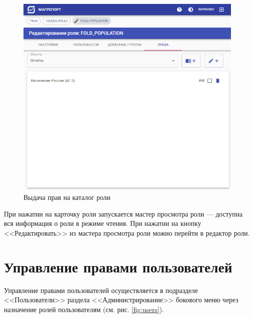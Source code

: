 \documentclass[../user-manual.tex]{subfiles}
\begin{document}
	\begin{figure}[h]
		\centering
		\includegraphics[width=\graphicswidth]{img/04-edit-role-folder-rights.png}
		\caption{Выдача прав на каталог роли}
		\label{fig:edit-role-folder-rights}
	\end{figure}

	При нажатии на карточку роли запускается мастер просмотра роли --- доступна вся информация о роли в режиме чтения. При нажатии на кнопку <<Редактировать>> из мастера просмотра роли можно перейти в редактор роли.
		
	\section{Управление правами пользователей}
	
	Управление правами пользователей осуществляется в подразделе <<Пользователи>> раздела <<Администрирование>> бокового меню через назначение ролей пользователям (см. рис. \ref{fig:users}).
	
\end{document}
